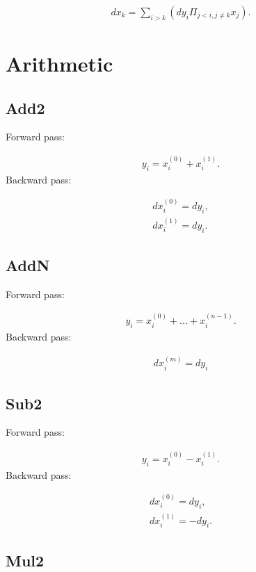 \documentclass{article}
\begin{document}
\begin{eqnarray}
  dx_k = \sum_{i > k} (dy_i \Pi_{j < i, j \neq k} x_j).
\end{eqnarray}


\section{Arithmetic}
\label{sec:Arithmetic}

\subsection{Add2}

Forward pass:

\begin{eqnarray}
  y_i = x^{(0)}_i + x^{(1)}_i.    
\end{eqnarray}
%
Backward pass:

\begin{eqnarray}
  dx^{(0)}_i = dy_i, \\
  dx^{(1)}_i = dy_i.
\end{eqnarray}


\subsection{AddN}

Forward pass:

\begin{eqnarray}
  y_i = x^{(0)}_i + . . . + x^{(n-1)}_i.    
\end{eqnarray}
%
Backward pass:

\begin{eqnarray}
   dx^{(m)}_i = dy_i
\end{eqnarray}

\subsection{Sub2}

Forward pass:

\begin{eqnarray}
  y_i = x^{(0)}_i - x^{(1)}_i.    
\end{eqnarray}
%
Backward pass:

\begin{eqnarray}
  dx^{(0)}_i = dy_i, \\
  dx^{(1)}_i = -dy_i. 
\end{eqnarray}


\subsection{Mul2}
\end{document}
